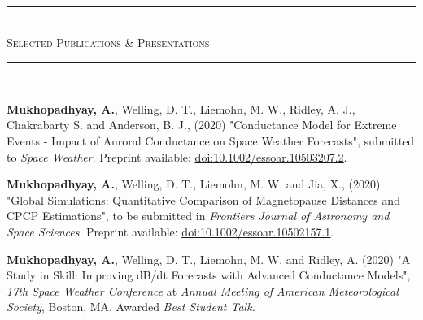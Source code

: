\documentclass[10pt]{article}
\begin{document}

\vspace{-0.5em}
\begin{center}
{\noindent\rule[0.5ex]{\linewidth}{0.5pt}\\
\vspace{-0.5em}\large{\textsc{Selected Publications \& Presentations}}\\
\vspace{-0.25em}
\noindent\rule[0.5ex]{\linewidth}{0.5pt}}\\
\vspace{-0.5em}
\end{center}
\vspace{-0.5em}
\textbf{Mukhopadhyay, A.}, Welling, D. T., Liemohn, M. W., Ridley, A. J., Chakrabarty S. and Anderson, B. J., (2020) "Conductance Model for Extreme Events - Impact of Auroral Conductance on Space Weather Forecasts", submitted to \textit{Space Weather}. Preprint available: \href{https://doi.org/10.1002/essoar.10503207.2}{\underline{doi:10.1002/essoar.10503207.2}}.\vspace{0.5em}


\textbf{Mukhopadhyay, A.}, Welling, D. T., Liemohn, M. W. and Jia, X., (2020) "Global Simulations: Quantitative Comparison of Magnetopause Distances and CPCP Estimations", to be submitted in \textit{Frontiers Journal of Astronomy and Space Sciences}. Preprint available: \href{https://doi.org/10.1002/essoar.10502157.1}{\underline{doi:10.1002/essoar.10502157.1}}.\vspace{0.5em}

\textbf{Mukhopadhyay, A.}, Welling, D. T., Liemohn, M. W. and Ridley, A. (2020) "A Study in Skill: Improving dB/dt Forecasts with Advanced Conductance Models", \textit{17th Space Weather Conference} at \textit{Annual Meeting of American Meteorological Society}, Boston, MA. Awarded \textit{Best Student Talk.} \vspace{0.5em}

\end{document}
